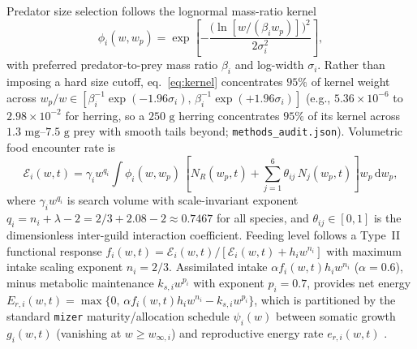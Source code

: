\documentclass[11pt,letterpaper]{article}
\begin{document}
Predator size selection follows the lognormal mass-ratio kernel
\begin{equation}
  \phi_i(w, w_p) = \exp\!\left[-\frac{\big(\ln[w / (\beta_i w_p)]\big)^2}{2\sigma_i^2}\right],
  \label{eq:kernel}
\end{equation}
with preferred predator-to-prey mass ratio $\beta_i$ and log-width $\sigma_i$. Rather than imposing a hard size cutoff, eq.~\eqref{eq:kernel} concentrates $95\%$ of kernel weight across $w_p / w \in [\beta_i^{-1}\exp(-1.96\sigma_i),\allowbreak\, \beta_i^{-1}\exp(+1.96\sigma_i)]$ (e.g., $5.36\times 10^{-6}$ to $2.98\times 10^{-2}$ for herring, so a $250\text{ g}$ herring concentrates $95\%$ of its kernel across $1.3\text{ mg}$--$7.5\text{ g}$ prey with smooth tails beyond; \texttt{methods\_\allowbreak audit.json}). Volumetric food encounter rate is
\begin{equation}
  \mathcal{E}_i(w,t) = \gamma_i w^{q_i} \int \phi_i(w, w_p)\,\left[N_R(w_p,t) + \sum_{j=1}^{6} \theta_{ij}\,N_j(w_p,t)\right] w_p\,\mathrm{d}w_p,
  \label{eq:encounter}
\end{equation}
where $\gamma_i w^{q_i}$ is search volume with scale-invariant exponent $q_i = n_i + \lambda - 2 = 2/3 + 2.08 - 2 \approx 0.7467$ for all species, and $\theta_{ij} \in [0,1]$ is the dimensionless inter-guild interaction coefficient. Feeding level follows a Type~II functional response $f_i(w,t) = \mathcal{E}_i(w,t) / [\mathcal{E}_i(w,t) + h_i w^{n_i}]$ with maximum intake scaling exponent $n_i = 2/3$. Assimilated intake $\alpha f_i(w,t) h_i w^{n_i}$ ($\alpha = 0.6$), minus metabolic maintenance $k_{s,i} w^{p_i}$ with exponent $p_i = 0.7$, provides net energy $E_{r,i}(w,t) = \max\{0,\, \alpha f_i(w,t) h_i w^{n_i} - k_{s,i} w^{p_i}\}$, which is partitioned by the standard \texttt{mizer} maturity/allocation schedule $\psi_i(w)$ between somatic growth $g_i(w,t)$ (vanishing at $w \ge w_{\infty,i}$) and reproductive energy rate $e_{r,i}(w,t)$ \citep{scott2014mizer,andersen2019fish}.
\end{document}
